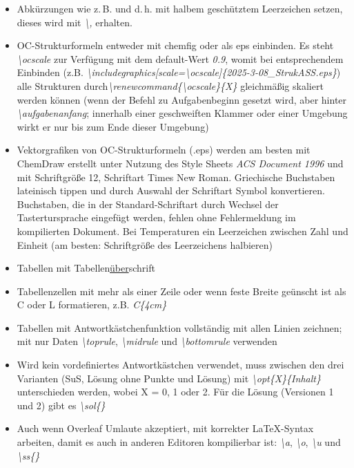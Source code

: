 \documentclass[./main.tex]{subfiles}
\begin{document}
\begin{itemize}
    \item \hypertarget{,}{} Abk\"urzungen wie z.\,B. und d.\,h. mit halbem gesch\"utztem Leerzeichen setzen, dieses wird mit \textit{\textbackslash ,} erhalten.
    \item OC-Strukturformeln entweder mit chemfig oder als eps einbinden. Es steht \textit{\textbackslash ocscale} zur Verf\"ugung mit dem default-Wert \textit{0.9}, womit bei entsprechendem Einbinden (z.B. \linebreak\textit{\textbackslash includegraphics[scale=\textbackslash ocscale]\{2025-3-08\_StrukASS.eps\}}) alle Strukturen durch\linebreak \textit{\textbackslash renewcommand\{\textbackslash ocscale\}\{X\}} gleichm\"a\ss{}ig skaliert werden k\"onnen (wenn der Befehl zu Aufgabenbeginn gesetzt wird, aber hinter \textit{\textbackslash aufgabenanfang}; innerhalb einer geschweiften Klammer oder einer Umgebung wirkt er nur bis zum Ende dieser Umgebung)
    \item Vektorgrafiken von OC-Strukturformeln (.eps) werden am besten mit ChemDraw erstellt unter Nutzung des Style Sheets \textit{ACS Document 1996} und mit Schriftgr\"o\ss{}e 12, Schriftart Times New Roman. Griechische Buchstaben lateinisch tippen und durch Auswahl der Schriftart \glqq Symbol\grqq{} konvertieren. Buchstaben, die in der Standard-Schriftart durch Wechsel der Tastertursprache eingef\"ugt werden, fehlen ohne Fehlermeldung im kompilierten Dokument. Bei Temperaturen ein Leerzeichen zwischen Zahl und Einheit (am besten: Schriftgr\"o\ss{}e des Leerzeichens halbieren)
    \item Tabellen mit Tabellen\underline{\"uber}schrift 
    \item Tabellenzellen mit mehr als einer Zeile oder wenn feste Breite ge\"unscht ist als C oder L formatieren, z.B. \textit{C\{4cm\}}
    \item Tabellen mit Antwortk\"astchenfunktion vollst\"andig mit allen Linien zeichnen; mit nur Daten \textit{\hypertarget{toprule}{\textbackslash toprule}}, \textit{\hypertarget{midrule}{\textbackslash midrule}} und \textit{\hypertarget{bottomrule}{\textbackslash bottomrule}} verwenden
    \item Wird kein vordefiniertes Antwortk\"astchen verwendet, muss zwischen den drei Varianten (SuS, L\"osung ohne Punkte und L\"osung) mit \textit{\textbackslash opt\{X\}\{Inhalt\}} unterschieden werden, wobei X = 0, 1 oder 2. F\"ur die L\"osung (Versionen 1 und 2) gibt es \hypertarget{sol}{\textit{\textbackslash sol\{\}}}
    \item Auch wenn Overleaf Umlaute akzeptiert, mit korrekter \LaTeX-Syntax arbeiten, damit es auch in anderen Editoren kompilierbar ist: \hypertarget{a}{\textit{\textbackslash\grqq{}a}}, \hypertarget{o}{\textit{\textbackslash\grqq{}o}}, \hypertarget{u}{\textit{\textbackslash\grqq{}u}} und \hypertarget{ss}{\textit{\textbackslash ss\{\}}}

\end{itemize}
\end{document}
